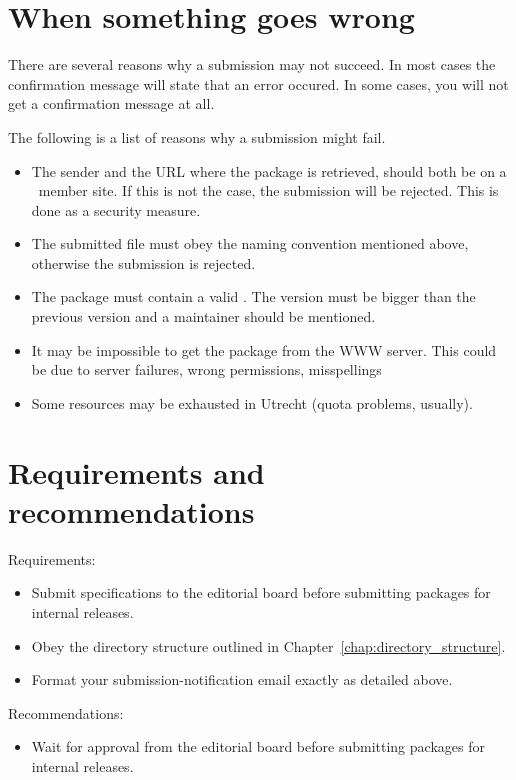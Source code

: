 \section{When something goes wrong}
\label{sec:submission_problems}

There are several reasons why a submission may not succeed.
In most cases the confirmation message will state that an error occured. In
some cases, you will not get a confirmation message at all.

The following is a list of reasons why a submission might fail.
\begin{itemize}

\item The sender and the URL where the package is retrieved, should both be 
      on a \cgal\ member site. If this is not the case, the submission will 
      be rejected.  This is done as a security measure.

\item The submitted file must obey the naming convention mentioned above, 
      otherwise the submission is rejected. 

\item The package must contain a valid .
      The version must be bigger than the previous version and a maintainer
      should be mentioned.

\item It may be impossible to get the package from the WWW server. 
      This could be due to server failures, wrong permissions, misspellings
      \etc

\item Some resources may be exhausted in Utrecht (quota problems, usually).

\end{itemize}


\section{Requirements and recommendations}
\label{sec:submission_req_and_rec}

\noindent
Requirements:
\begin{itemize}
   \item Submit specifications to the editorial board before submitting
         packages for internal releases.
   \item Obey the directory structure outlined in Chapter~\ref{chap:directory_structure}.
   \item Format your submission-notification email exactly as detailed above.
\end{itemize}

\noindent
Recommendations:
\begin{itemize}
    \item Wait for approval from the editorial board before submitting packages
          for internal releases.
\end{itemize}

